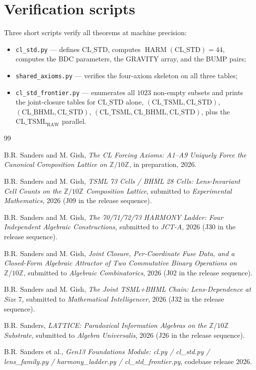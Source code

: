 \documentclass[11pt,reqno]{amsart}
\theoremstyle{definition}
\newcommand{\Z}{\mathbb{Z}}
\newcommand{\TSML}{\mathrm{CL\_TSML}}
\newcommand{\BHML}{\mathrm{CL\_BHML}}
\newcommand{\STDx}{\mathrm{CL\_STD}}
\DeclareMathOperator{\HARM}{HARM}
\begin{document}
\section*{Verification scripts}

Three short scripts verify all theorems at machine precision:

\begin{itemize}[leftmargin=*]
\item \texttt{cl\_std.py} — defines $\STDx$, computes
  $\HARM(\STDx) = 44$, computes the BDC parameters, the GRAVITY
  array, and the BUMP pairs;
\item \texttt{shared\_axioms.py} — verifies the four-axiom
  skeleton on all three tables;
\item \texttt{cl\_std\_frontier.py} — enumerates all $1023$
  non-empty subsets and prints the joint-closure tables for
  $\STDx$ alone, $(\TSML, \STDx)$, $(\BHML, \STDx)$,
  $(\TSML, \BHML, \STDx)$, plus the $\TSML_{\mathrm{RAW}}$
  parallel.
\end{itemize}

\begin{thebibliography}{99}

B.R. Sanders and M. Gish, \emph{The CL Forcing Axioms: A1--A9
Uniquely Force the Canonical Composition Lattice on $\Z/10\Z$},
in preparation, 2026.

B.R. Sanders and M. Gish, \emph{TSML 73 Cells / BHML 28 Cells:
Lens-Invariant Cell Counts on the $\Z/10\Z$ Composition Lattice},
submitted to \emph{Experimental Mathematics}, 2026 (J09 in the
release sequence).

B.R. Sanders and M. Gish, \emph{The 70/71/72/73 HARMONY Ladder:
Four Independent Algebraic Constructions}, submitted to
\emph{JCT-A}, 2026 (J30 in the release sequence).

B.R. Sanders and M. Gish, \emph{Joint Closure, Per-Coordinate Fuse
Data, and a Closed-Form Algebraic Attractor of Two Commutative
Binary Operations on $\Z/10\Z$}, submitted to \emph{Algebraic
Combinatorics}, 2026 (J02 in the release sequence).

B.R. Sanders and M. Gish, \emph{The Joint TSML+BHML Chain:
Lens-Dependence at Size $7$}, submitted to \emph{Mathematical
Intelligencer}, 2026 (J32 in the release sequence).

B.R. Sanders, \emph{LATTICE: Paradoxical Information Algebras on
the $\Z/10\Z$ Substrate}, submitted to \emph{Algebra Universalis},
2026 (J26 in the release sequence).

B.R. Sanders et al., \emph{Gen13 Foundations Module: cl.py /
cl\_std.py / lens\_family.py / harmony\_ladder.py / cl\_std\_frontier.py},
codebase release 2026.

\end{thebibliography}
\end{document}
